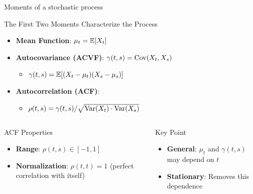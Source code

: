 \documentclass[9pt, aspectratio=169, t]{beamer}
\begin{document}
\begin{frame}{Moments of a stochastic process}
    \begin{block}{The First Two Moments Characterize the Process}
        \begin{itemize}\setlength{\itemsep}{0pt}
            \item \textbf{Mean Function}: $\mu_t = \mathbb{E}[X_t]$
            \item \textbf{Autocovariance (ACVF)}: $\gamma(t, s) = \text{Cov}(X_t, X_s)$
            \begin{itemize}
                \item $\gamma(t, s) = \mathbb{E}[(X_t - \mu_t)(X_s - \mu_s)]$
            \end{itemize}
            \item \textbf{Autocorrelation (ACF)}:
            \begin{itemize}
                \item $\rho(t, s) = \gamma(t, s) / \sqrt{\text{Var}(X_t) \cdot \text{Var}(X_s)}$
            \end{itemize}
        \end{itemize}
    \end{block}

    \begin{columns}[T]
        \begin{exampleblock}{ACF Properties}
            \begin{itemize}\setlength{\itemsep}{0pt}
                \item \textbf{Range}: $\rho(t, s) \in [-1, 1]$
                \item \textbf{Normalization}: $\rho(t, t) = 1$ (perfect correlation with itself)
            \end{itemize}
        \end{exampleblock}
        \begin{alertblock}{Key Point}
            \begin{itemize}\setlength{\itemsep}{0pt}
                \item \textbf{General}: $\mu_t$ and $\gamma(t,s)$ may depend on $t$
                \item \textbf{Stationary}: Removes this dependence
            \end{itemize}
        \end{alertblock}
    \end{columns}
\end{frame}
\end{document}
